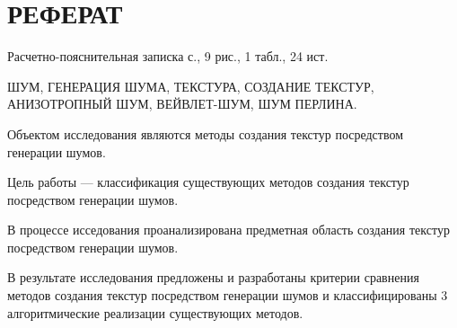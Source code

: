 \chapter*{РЕФЕРАТ}

Расчетно-пояснительная записка \pageref{LastPage} с., 9 рис., 1 табл., 24 ист.

ШУМ, ГЕНЕРАЦИЯ ШУМА, ТЕКСТУРА, СОЗДАНИЕ ТЕКСТУР, АНИЗОТРОПНЫЙ ШУМ, ВЕЙВЛЕТ-ШУМ, ШУМ ПЕРЛИНА.

Объектом исследования являются методы создания текстур посредством генерации шумов.

Цель работы --- классификация существующих методов создания текстур посредством генерации шумов.

В процессе исседования проанализирована предметная область создания текстур посредством генерации шумов.

В результате исследования предложены и разработаны критерии сравнения методов создания текстур посредством генерации шумов и классифицированы 3 алгоритмические реализации существующих методов.